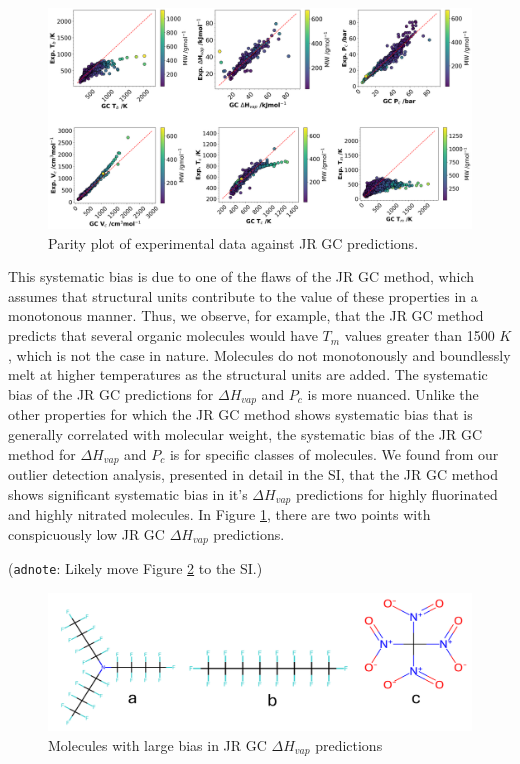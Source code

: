\documentclass[journal=jacsat,manuscript=article]{achemso}
\newcommand{\adnote}[1]{{\color{OliveGreen} (\texttt{adnote}: #1)}}
\begin{document}
\begin{figure}[H]
    \centering
    \includegraphics[width=1.1\linewidth]{images/2D_GC_bias.png}
    \caption{Parity plot of experimental data against JR GC predictions.}
    \label{fig:2D_JRGC_bias}
\end{figure}

This systematic bias is due to one of the flaws of the JR GC method, which assumes that structural units contribute to the value of these properties in a monotonous manner. Thus, we observe, for example, that the JR GC method predicts that several organic molecules would have $T_m$ values greater than 1500 $K$, which is not the case in nature. Molecules do not monotonously and boundlessly melt at higher temperatures as the structural units are added.
The systematic bias of the JR GC predictions for $\Delta H_{vap}$ and $P_c$ is more nuanced. Unlike the other properties for which the JR GC method shows systematic bias that is generally correlated with molecular weight, the systematic bias of the JR GC method for $\Delta H_{vap}$ and $P_c$ is for specific classes of molecules.
We found from our outlier detection analysis, presented in detail in the SI, that the JR GC method shows significant systematic bias in it's $\Delta H_{vap}$ predictions for highly fluorinated and highly nitrated molecules. In Figure \ref{fig:2D_JRGC_bias}, there are two points with conspicuously low JR GC $\Delta H_{vap}$ predictions. 

\adnote{Likely move Figure \ref{fig:JRGC_Hvap_bias_molecules} to the SI.}

\begin{figure}[H]
    \centering
    \includegraphics[width=0.8\linewidth]{images/Hvap_molecules_with_large_bias.png}
    \caption{Molecules with large bias in JR GC $\Delta H_{vap}$ predictions}
    \label{fig:JRGC_Hvap_bias_molecules}
\end{figure}
\end{document}
